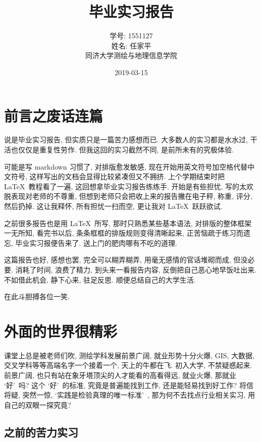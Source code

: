 \documentclass[a4paper, UTF8,  12pt]{article}
\begin{document}
\title{\Huge 毕业实习报告}
\author{\large 学号: 1551127\\
        姓名: 任家平 \\
        同济大学测绘与地理信息学院}
\date{2019-03-15}
\maketitle
\thispagestyle{empty}
\newpage

\tableofcontents
\thispagestyle{empty}
\newpage

\section{前言之废话连篇}
说是毕业实习报告, 但实质只是一篇苦力感想而已. 大多数人的实习都是水水过, 干活也仅仅是重复性劳作. 但我这回的实习截然不同, 是前所未有的究极体验. 

可能是写 markdown 习惯了, 对排版愈发敏感, 现在开始用英文符号加空格代替中文符号, 这样写出的文档会显得比较紧凑但又不拥挤. 上个学期结束时把 \LaTeX\ 教程看了一遍, 这回想拿毕业实习报告练练手. 开始是有些担忧, 写的太欢脱表现对老师的不尊重, 但想到老师只会把收上来的报告撇在电子秤, 称重, 评分, 然后扔掉. 这让我释怀, 所有担忧一扫而空, 更让我对 \LaTeX\ 跃跃欲试. 

之前很多报告也是用 \LaTeX\ 所写, 那时只熟悉某些基本语法, 对排版的整体框架一无所知, 看完书以后, 条条框框的排版规则变得清晰起来, 正苦恼疏于练习而遗忘, 毕业实习报便告来了. 送上门的肥肉哪有不吃的道理.

这篇报告也好, 感想也罢, 完全可以糊弄糊弄, 用毫无感情的官话堆砌而成, 但没必要. 消耗了时间, 浪费了精力, 到头来一看报告内容, 反倒把自己恶心地早饭吐出来. 不如借此机会, 静下心来, 驻足反思. 顺便总结自己的大学生活. 

在此斗胆搏各位一笑.

\newpage
\section{外面的世界很精彩}
课堂上总是被老师们吹, 测绘学科发展前景广阔, 就业形势十分火爆, GIS, 大数据, 交叉学科等等高端名字一个接着一个, 天上的牛都在飞. 初入大学, 不禁疑惑起来. 前景广阔, 也只有站在象牙塔顶尖的人才能看的高看得远, 就业火爆, 那就业 \lq 好\rq\ 吗? 这个 \lq 好\rq\ 的标准, 究竟是普遍能找到工作, 还是能轻易找到好工作? 将信将疑, 突然一惊, \lq 实践是检验真理的唯一标准\rq\ , 那为何不去找点行业相关实习, 用自己的双眼一探究竟?

\subsection{之前的苦力实习}
\end{document}
